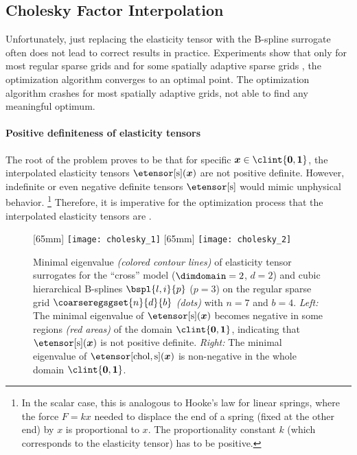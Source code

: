 \subsection{Cholesky Factor Interpolation}
\label{sec:623cholesky}

Unfortunately, just replacing the elasticity tensor with
the B-spline surrogate often does not lead to correct results in practice.
Experiments show that only for most regular sparse grids and
for some spatially adaptive sparse grids \cite{Valentin16Hierarchical},
the optimization algorithm converges to an optimal point.
The optimization algorithm crashes for most spatially adaptive grids,
not able to find any meaningful optimum.

\paragraph{Positive definiteness of elasticity tensors}

The root of the problem proves to be that for specific
$\*x \in \clint{\*0, \*1}$,
the interpolated elasticity tensors $\etensor[\sparse](\*x)$ are not
positive definite.
However, indefinite or even negative definite tensors $\etensor[\sparse]$
would mimic unphysical behavior.%
\footnote{%
  In the scalar case, this is analogous to Hooke's law for linear springs,
  where the force $F = kx$ needed to displace the end of a spring
  (fixed at the other end) by $x$ is proportional to $x$.
  The proportionality constant $k$ (which corresponds to the elasticity tensor)
  has to be positive.%
}
Therefore, it is imperative for the optimization process that
the interpolated elasticity tensors are \spd.

\blindtext{}

\begin{figure}
  [65mm]{%
    \texttt{[image: cholesky\_1]}%
  }%
  \hfill%
  [65mm]{%
    \texttt{[image: cholesky\_2]}%
  }%
  \hfill\hfill%
  \caption[%
    Minimal eigenvalue of interpolated elasticity tensors%
  ]{%
    Minimal eigenvalue \emph{(colored contour lines)}
    of elasticity tensor surrogates
    for the ``cross'' model ($\dimdomain = 2$, $d = 2$)
    and cubic hierarchical B-splines $\bspl{l,i}{p}$ ($p = 3$) on
    the regular sparse grid $\coarseregsgset{n}{d}{b}$ \emph{(dots)}
    with $n = 7$ and $b = 4$.
    \emph{Left:} The minimal eigenvalue of $\etensor[\sparse](\*x)$
    becomes negative in some regions \emph{\textcolor{C1}{(red areas)}}
    of the domain $\clint{\*0, \*1}$,
    indicating that $\etensor[\sparse](\*x)$ is not positive definite.
    \emph{Right:} The minimal eigenvalue of $\etensor[\chol,\sparse](\*x)$
    is non-negative in the whole domain $\clint{\*0, \*1}$.%
  }%
  \label{fig:cholesky}%
\end{figure}

